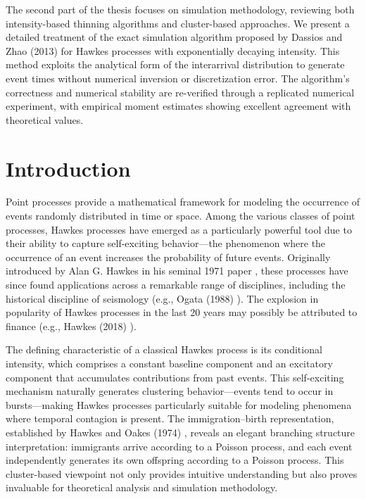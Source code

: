 \documentclass[12pt,a4paper]{report}
\theoremstyle{plain}
\theoremstyle{definition}
\theoremstyle{remark}
\newcommand{\1}{\mathbf{1}}
\begin{document}
\noindent
The second part of the thesis focuses on simulation methodology, reviewing both intensity-based thinning algorithms and cluster-based approaches. We present a detailed treatment of the exact simulation algorithm proposed by Dassios and Zhao (2013) \cite{DZ13} for Hawkes processes with exponentially decaying intensity. This method exploits the analytical form of the interarrival distribution to generate event times without numerical inversion or discretization error. The algorithm's correctness and numerical stability are re-verified through a replicated numerical experiment, with empirical moment estimates showing excellent agreement with theoretical values.
\clearpage

\tableofcontents
\clearpage

\setcounter{page}{1}

\clearpage

\chapter{Introduction}
\label{chap:introduction}
Point processes provide a mathematical framework for modeling the occurrence of events randomly distributed in time or space. Among the various classes of point processes, Hawkes processes have emerged as a particularly powerful tool due to their ability to capture self-exciting behavior---the phenomenon where the occurrence of an event increases the probability of future events. Originally introduced by Alan G. Hawkes in his seminal 1971 paper \cite{Haw71}, these processes have since found applications across a remarkable range of disciplines, including the historical discipline of seismology (e.g., Ogata (1988) \cite{Oga88}). The explosion in popularity of Hawkes processes in the last 20 years may possibly be attributed to finance (e.g., Hawkes (2018) \cite{Haw18}).

\medskip
\noindent
The defining characteristic of a classical Hawkes process is its conditional intensity, which comprises a constant baseline component and an excitatory component that accumulates contributions from past events. This self-exciting mechanism naturally generates clustering behavior---events tend to occur in bursts---making Hawkes processes particularly suitable for modeling phenomena where temporal contagion is present. The immigration--birth representation, established by Hawkes and Oakes (1974) \cite{HO74}, reveals an elegant branching structure interpretation: immigrants arrive according to a Poisson process, and each event independently generates its own offspring according to a Poisson process. This cluster-based viewpoint not only provides intuitive understanding but also proves invaluable for theoretical analysis and simulation methodology.
\end{document}
